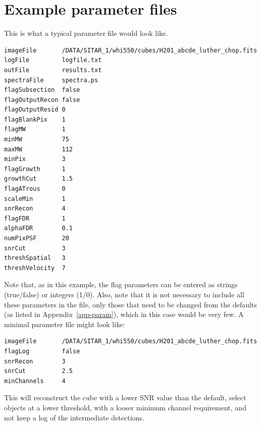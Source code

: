 \documentclass[12pt,a4paper]{article}
\begin{document}
\newpage
\section{Example parameter files}
\label{app-input}

This is what a typical parameter file would look like.

\begin{verbatim}
imageFile       /DATA/SITAR_1/whi550/cubes/H201_abcde_luther_chop.fits
logFile         logfile.txt
outFile         results.txt
spectraFile     spectra.ps
flagSubsection  false
flagOutputRecon false
flagOutputResid 0
flagBlankPix    1
flagMW          1
minMW           75
maxMW           112
minPix          3
flagGrowth      1
growthCut       1.5
flagATrous      0
scaleMin        1
snrRecon        4
flagFDR         1
alphaFDR        0.1
numPixPSF       20
snrCut          3
threshSpatial   3
threshVelocity  7
\end{verbatim}

Note that, as in this example, the flag parameters can be entered as
strings (true/false) or integers (1/0). Also, note that it is not
necessary to include all these parameters in the file, only those that
need to be changed from the defaults (as listed in
Appendix~\ref{app-param}), which in this case would be very few. A
minimal parameter file might look like:
\begin{verbatim}
imageFile       /DATA/SITAR_1/whi550/cubes/H201_abcde_luther_chop.fits
flagLog         false
snrRecon        3
snrCut          2.5
minChannels     4
\end{verbatim}
This will reconstruct the cube with a lower SNR value than the
default, select objects at a lower threshold,  with a looser minimum
channel requirement, and not keep a log of the intermediate
detections. 
\end{document}
